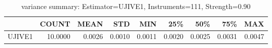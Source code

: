 \begin{table}[ht]
\centering
\caption{variance summary: Estimator=UJIVE1, Instruments=111, Strength=0.90}
\begin{tabular}{lrrrrrrrr}
\toprule
 & COUNT & MEAN & STD & MIN & 25\% & 50\% & 75\% & MAX \\
\midrule
UJIVE1 & 10.0000 & 0.0026 & 0.0010 & 0.0011 & 0.0020 & 0.0025 & 0.0031 & 0.0047 \\
\bottomrule
\end{tabular}
\end{table}
